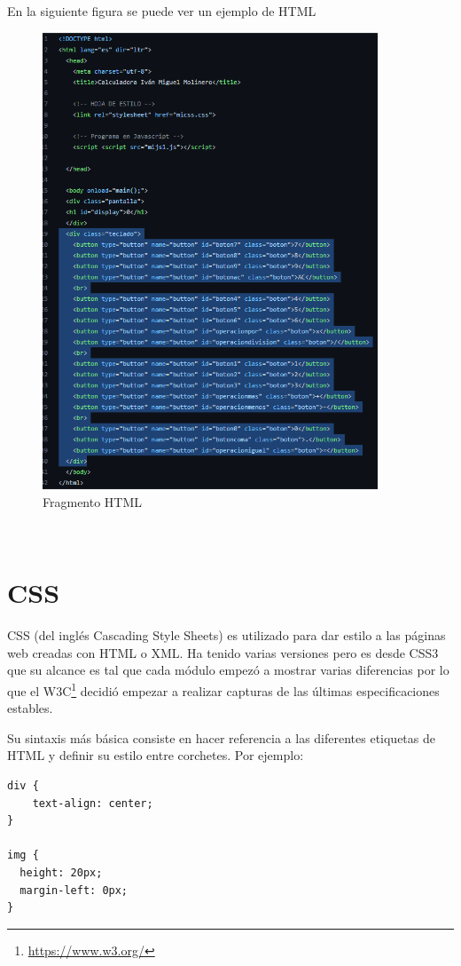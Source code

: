 \documentclass[a4paper, 12pt]{book}
\begin{document}
En la siguiente figura se puede ver un ejemplo de HTML
\begin{figure}
  \centering
  \includegraphics[width=10cm, keepaspectratio]{img/html.png}
  \caption{Fragmento HTML}\label{fig:html}
\end{figure}
\\

\section{CSS}
\label{sec:CSS}

CSS\cite{website:CSS} (del inglés Cascading Style Sheets) es utilizado para dar estilo a las páginas web creadas con HTML o XML. Ha tenido varias versiones pero es desde CSS3 que su alcance es tal que cada módulo empezó a mostrar varias diferencias por lo que el W3C\footnote{\url{https://www.w3.org/}}  decidió empezar a realizar capturas de las últimas especificaciones estables.

Su sintaxis más básica consiste en hacer referencia a las diferentes etiquetas de HTML y definir su estilo entre corchetes. Por ejemplo:

\begin{verbatim}
div {
    text-align: center;
}

img {
  height: 20px;
  margin-left: 0px;
}
\end{verbatim}
\end{document}
